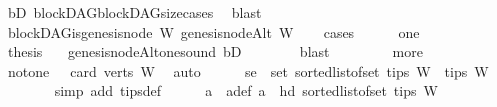 \begin{isabellebody}
\ bD\ blockDAG{\isachardot}{\kern0pt}blockDAG{\isacharunderscore}{\kern0pt}size{\isacharunderscore}{\kern0pt}cases\ \isamarkupfalse%
\ blast\isanewline
\ \ \isamarkupfalse%
\ \isamarkupfalse%
\ {\isachardoublequoteopen}blockDAG{\isachardot}{\kern0pt}is{\isacharunderscore}{\kern0pt}genesis{\isacharunderscore}{\kern0pt}node\ W\ {\isacharparenleft}{\kern0pt}genesis{\isacharunderscore}{\kern0pt}nodeAlt\ W{\isacharparenright}{\kern0pt}{\isachardoublequoteclose}\ \isanewline
\ \ \isamarkupfalse%
{\isacharparenleft}{\kern0pt}cases{\isacharparenright}{\kern0pt}\isanewline
\ \ \ \ \isamarkupfalse%
\ one\isanewline
\ \ \ \ \isamarkupfalse%
\ \isamarkupfalse%
\ {\isacharquery}{\kern0pt}thesis\ \ \isamarkupfalse%
\ genesis{\isacharunderscore}{\kern0pt}nodeAlt{\isacharunderscore}{\kern0pt}one{\isacharunderscore}{\kern0pt}sound\ bD\isanewline
\ \ \ \ \ \ \isamarkupfalse%
\ blast\isanewline
\ \ \isamarkupfalse%
\isanewline
\ \ \ \ \isamarkupfalse%
\ more\isanewline
\ \ \ \ \isamarkupfalse%
\ \isamarkupfalse%
\ not{\isacharunderscore}{\kern0pt}one{\isacharcolon}{\kern0pt}\ {\isachardoublequoteopen}{}\ {\isasymnoteq}\ card\ {\isacharparenleft}{\kern0pt}verts\ W{\isacharparenright}{\kern0pt}{\isachardoublequoteclose}\ \isamarkupfalse%
\ auto\isanewline
\ \ \ \ \isamarkupfalse%
\ se{\isacharcolon}{\kern0pt}\ {\isachardoublequoteopen}\ set\ {\isacharparenleft}{\kern0pt}sorted{\isacharunderscore}{\kern0pt}list{\isacharunderscore}{\kern0pt}of{\isacharunderscore}{\kern0pt}set\ {\isacharparenleft}{\kern0pt}tips\ W{\isacharparenright}{\kern0pt}{\isacharparenright}{\kern0pt}\ {\isacharequal}{\kern0pt}\ tips\ W{\isachardoublequoteclose}\ \ \isanewline
\ \ \ \ \ \ \isamarkupfalse%
\ {\isacharparenleft}{\kern0pt}simp\ add{\isacharcolon}{\kern0pt}\ tips{\isacharunderscore}{\kern0pt}def{\isacharparenright}{\kern0pt}\isanewline
\ \ \ \ \isamarkupfalse%
\ a\ \ a{\isacharunderscore}{\kern0pt}def{\isacharcolon}{\kern0pt}\ {\isachardoublequoteopen}a\ {\isacharequal}{\kern0pt}\ hd\ {\isacharparenleft}{\kern0pt}sorted{\isacharunderscore}{\kern0pt}list{\isacharunderscore}{\kern0pt}of{\isacharunderscore}{\kern0pt}set\ {\isacharparenleft}{\kern0pt}tips\ W{\isacharparenright}{\kern0pt}{\isacharparenright}{\kern0pt}{\isachardoublequoteclose}\isanewline
\ \ \ \ \ \ \isamarkupfalse%

\end{isabellebody}
